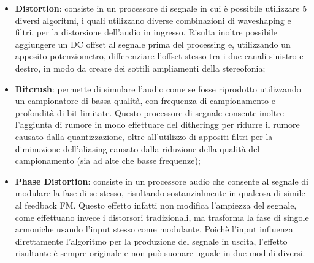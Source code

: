 \begin{itemize}
    \item \textbf{Distortion}: consiste in un processore di segnale in cui è possibile utilizzare 5 diversi algoritmi, i quali utilizzano diverse combinazioni di waveshaping e filtri, per la distorsione dell'audio in ingresso. Risulta inoltre possibile aggiungere un DC offset al segnale prima del processing e, utilizzando un apposito potenziometro, differenziare l'offset stesso tra i due canali sinistro e destro, in modo da creare dei sottili ampliamenti della stereofonia;
    \item \textbf{Bitcrush}: permette di simulare l'audio come se fosse riprodotto utilizzando un campionatore di bassa qualità, con frequenza di campionamento e profondità di bit limitate. Questo processore di segnale consente inoltre l'aggiunta di rumore in modo effettuare del \gls{ditheringg} per ridurre il rumore causato dalla quantizzazione, oltre all'utilizzo di appositi filtri per la diminuzione dell'aliasing causato dalla riduzione della qualità del campionamento (sia ad alte che basse frequenze);
    \item \textbf{Phase Distortion}: consiste in un processore audio che consente al segnale di modulare la fase di se stesso, risultando sostanzialmente in qualcosa di simile al feedback FM. Questo effetto infatti non modifica l'ampiezza del segnale, come effettuano invece i distorsori tradizionali, ma trasforma la fase di singole armoniche usando l'input stesso come modulante. Poichè l'input influenza direttamente l'algoritmo per la produzione del segnale in uscita, l'effetto risultante è sempre originale e non può suonare uguale in due moduli diversi.
\end{itemize}


